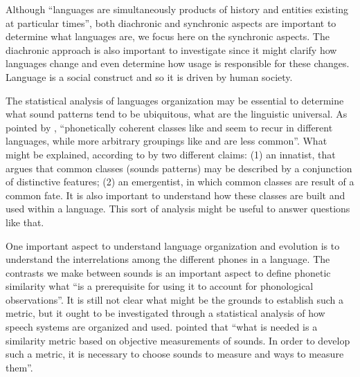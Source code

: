 
Although ``languages are simultaneously products of history and entities existing at particular times''\citep{good2008},
both diachronic and synchronic aspects are important to determine what languages are, we focus here on the
synchronic aspects. %
The diachronic approach is also important to investigate since it might clarify 
how languages change and even determine how usage is responsible for these changes. 
Language is a social construct and so it is driven by human society.

The statistical analysis of languages organization may be essential to determine what sound patterns tend to be 
ubiquitous, what are the linguistic universal.
As pointed by \cite{mielke2005}, ``phonetically coherent classes like  and  
seem to recur in different languages, while more arbitrary groupings like  and 
 are less common''. What might be explained, according to \cite{mielke2005} 
by two different claims: (1) an innatist, that argues that common classes (sounds patterns) may be described 
by a conjunction of distinctive features; (2) an emergentist, in which common classes are result of a 
common fate. It is also important to understand how these classes are built and used within a language. 
This sort of analysis might be useful to answer questions like that.

One important aspect to understand language organization and evolution is to understand the 
interrelations among the different phones in a language.
The contrasts we make between sounds is an important aspect to define phonetic similarity what 
``is a prerequisite for using it to account for phonological observations''\citep{mielke2005}. 
It is still not clear what might be the grounds to establish such a metric, but it ought to be investigated 
through a statistical analysis of how speech systems are organized and used. 
\cite{mielke2005} pointed that ``what is needed is a similarity metric based on objective measurements of sounds. 
In order to develop such a metric, it is necessary to choose sounds to measure and ways to measure them''.

